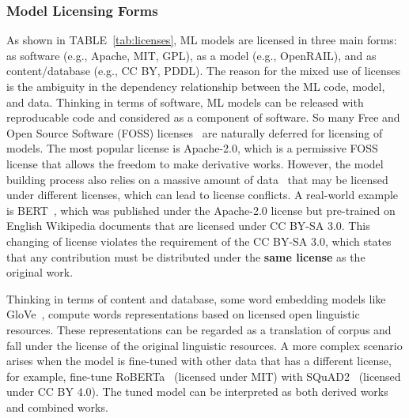 \subsubsection{Model Licensing Forms}
\label{sec:licensing}
As shown in TABLE~\ref{tab:licenses}, ML models are licensed in three main forms: as software (e.g., Apache, MIT, GPL), as a model (e.g., OpenRAIL), and as content/database (e.g., CC BY, PDDL).
The reason for the mixed use of licenses is the ambiguity in the dependency relationship between the ML code, model, and data.
Thinking in terms of software, ML models can be released with reproducable code and considered as a component of software.
So many Free and Open Source Software (FOSS) licenses~\cite{rosen2005open} are naturally deferred for licensing of models.
The most popular license is Apache-2.0, which is a permissive FOSS license that allows the freedom to make derivative works.
However, the model building process also relies on a massive amount of data~\cite{lecun2015deep} that may be licensed under different licenses, which can lead to license conflicts.
A real-world example is BERT~\cite{devlin2018bert}, which was published under the Apache-2.0 license but pre-trained on English Wikipedia documents that are licensed under CC BY-SA 3.0.
This changing of license violates the requirement of the CC BY-SA 3.0, which states that any contribution must be distributed under the \textbf{same license} as the original work.


Thinking in terms of content and database, some word embedding models like GloVe~\cite{pennington2014glove}, compute words representations based on licensed open linguistic resources.
These representations can be regarded as a translation of corpus and fall under the license of the original linguistic resources.
A more complex scenario arises when the model is fine-tuned with other data that has a different license, for example, fine-tune RoBERTa~\cite{liu2019roberta} (licensed under MIT) with SQuAD2~\cite{rajpurkar2016squad} (licensed under CC BY 4.0).
The tuned model can be interpreted as both derived works and combined works.

